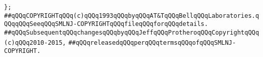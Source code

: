 \verb|};|\newline
\newline
\newline
\verb|##qQQqCOPYRIGHTqQQq(c)qQQq1993qQQqbyqQQqAT&TqQQqBellqQQqLaboratories.qQQqqQQqSeeqQQqSMLNJ-COPYRIGHTqQQqfileqQQqforqQQqdetails.|\newline
\verb|##qQQqSubsequentqQQqchangesqQQqbyqQQqJeffqQQqProtheroqQQqCopyrightqQQq(c)qQQq2010-2015,|\newline
\verb|##qQQqreleasedqQQqperqQQqtermsqQQqofqQQqSMLNJ-COPYRIGHT.|\newline

